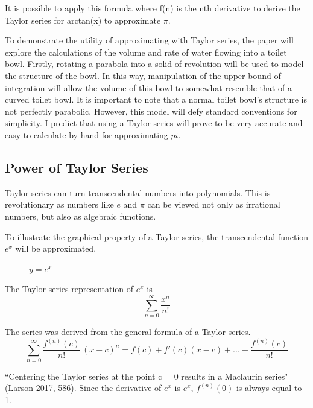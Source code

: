 \documentclass[12pt, titlepage]{article}
\begin{document}
It is possible to apply this formula where f(n) is the nth derivative to derive the Taylor series for arctan(x) to approximate \(\pi\).

To demonstrate the utility of approximating with Taylor series, the paper will explore the calculations of the volume and rate of water flowing into a toilet bowl. Firstly, rotating a parabola into a solid of revolution will be used to model the structure of the bowl. In this way, manipulation of the upper bound of integration will allow the volume of this bowl to somewhat resemble that of a curved toilet bowl. It is important to note that a normal toilet bowl's structure is not perfectly parabolic. However, this model will defy standard conventions for simplicity. I predict that using a Taylor series will prove to be very accurate and easy to calculate by hand for approximating \(pi\). 

\subsection{Power of Taylor Series}
Taylor series can turn transcendental numbers into polynomials. This is revolutionary as numbers like \(e\) and \(\pi\) can be viewed not only as irrational numbers, but also as algebraic functions.

To illustrate the graphical property of a Taylor series, the transcendental function \(e^{x}\) will be approximated.
\begin{figure}[H]
\centering
    \caption[]{\(y=e^x\)}
\end{figure}

The Taylor series representation of \(e^{x}\) is  
\begin{equation*}
  \sum_{n=0}^{\infty} \frac{x^{n}}{n!}
\end{equation*}

The series was derived from the general formula of a Taylor series.
\begin{equation*}
  \sum_{n=0}^{\infty} \frac{f^{(n)}(c)}{n!} \, (x-c)^{n} = f(c) + f'(c)(x-c) + ... +  \frac{f^{(n)}(c)}{n!}
\end{equation*}

``Centering the Taylor series at the point c = 0 results in a Maclaurin series" (Larson 2017, 586). Since the derivative of \(e^{x}\) is \(e^{x}\), \(f^{(n)}(0)\) is always equal to 1.
\end{document}
